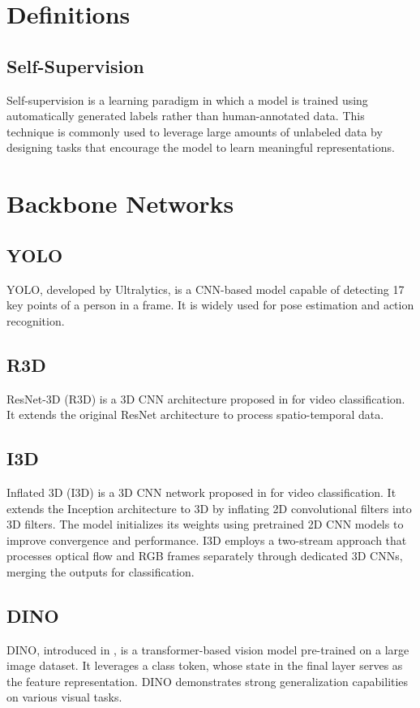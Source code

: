 \newpage
\appendix
\onecolumn

\section{Definitions}

\subsection{Self-Supervision}
Self-supervision is a learning paradigm in which a model is trained using automatically generated labels rather than human-annotated data. This technique is commonly used to leverage large amounts of unlabeled data by designing tasks that encourage the model to learn meaningful representations.

\section{Backbone Networks}

\subsection*{YOLO}
YOLO, developed by Ultralytics, is a CNN-based model capable of detecting 17 key points of a person in a frame. It is widely used for pose estimation and action recognition.

\subsection*{R3D}
ResNet-3D (R3D) is a 3D CNN architecture proposed in \cite{resnet-3d} for video classification. It extends the original ResNet architecture to process spatio-temporal data.

\subsection*{I3D}
Inflated 3D (I3D) is a 3D CNN network proposed in \cite{i3d} for video classification. It extends the Inception architecture to 3D by inflating 2D convolutional filters into 3D filters. The model initializes its weights using pretrained 2D CNN models to improve convergence and performance. I3D employs a two-stream approach that processes optical flow and RGB frames separately through dedicated 3D CNNs, merging the outputs for classification.

\subsection*{DINO}
DINO, introduced in \cite{dinov2}, is a transformer-based vision model pre-trained on a large image dataset. It leverages a class token, whose state in the final layer serves as the feature representation. DINO demonstrates strong generalization capabilities on various visual tasks.

